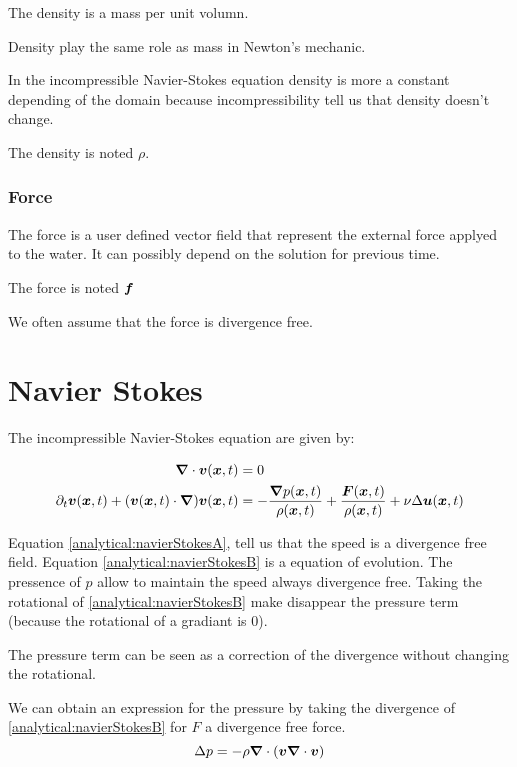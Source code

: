 The density is a mass per unit volumn.

Density play the same role as mass in Newton's mechanic.

In the incompressible Navier-Stokes equation density is more a constant depending
of the domain because incompressibility tell us that density doesn't change.

The density is noted $\rho$.

\subsubsection{Force}

The force is a user defined vector field that represent the external force applyed to the water.
It can possibly depend on the solution for previous time.

The force is noted ${\boldsymbol {f}}$

We often assume that the force is divergence free.
\section{Navier Stokes}

The incompressible Navier-Stokes equation are given by:

\begin{align}
\label{analytical:navierStokesA}
{\boldsymbol {\nabla}} \cdot {\boldsymbol {v}}({\boldsymbol {x}} ,t)&=0\\
\label{analytical:navierStokesB}
\partial_t {\boldsymbol {v}}({\boldsymbol {x}} ,t)+({\boldsymbol {v}}({\boldsymbol {x}},t)\cdot{\boldsymbol {\nabla}} ) {\boldsymbol {v}}({\boldsymbol {x}} ,t)&=-\frac{{\boldsymbol {\nabla}} p({\boldsymbol {x}},t)}{\rho({\boldsymbol {x}},t)}+\frac{{\boldsymbol {F}}({\boldsymbol {x}},t)}{\rho({\boldsymbol {x}},t)}+\nu \Delta {\boldsymbol {u}}({\boldsymbol {x}},t)
\end{align}

Equation \ref{analytical:navierStokesA}, tell us that the speed is a divergence free field.
Equation \ref{analytical:navierStokesB} is a equation of evolution. The pressence of $p$ allow to maintain the speed always divergence free.
Taking the rotational of \ref{analytical:navierStokesB} make disappear the pressure term (because the rotational of a gradiant is 0).

The pressure term can be seen as a correction of the divergence without changing the rotational.

We can obtain an expression for the pressure by taking the divergence of \ref{analytical:navierStokesB} for $F$ a divergence free force.
\begin{equation}
\label{analytical:pressure}
\Delta p=-\rho {\boldsymbol {\nabla}} \cdot ({\boldsymbol {v}}{\boldsymbol {\nabla}} \cdot {\boldsymbol {v}})
\end{equation}

